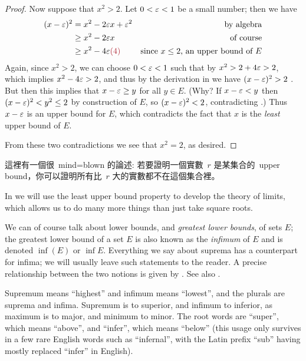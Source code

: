 \begin{proof}
Now suppose that \(x^2 > 2\).
Let \(0 < \varepsilon < 1\) be a small number;
then we have
\begin{align*}
    (x - \varE)^2 & = x^2 - 2\varE x + \varE^2 & \text{by algebra} \\
                  & \ge x^2 - 2\varE x & \text{of course} \\
                  & \ge x^2 - 4\varE \MAROON{(4)} & \text{since \(x \le 2\), an upper bound of \(E\)}
\end{align*}
Again, since \(x^2 > 2\), we can choose \(0 < \varepsilon < 1\) such that by  \(x^2 > 2 + 4\varepsilon > 2\), which implies \(x^2 - 4\varepsilon > 2\), and thus by the derivation in  we have \((x - \varepsilon)^2 > 2\) .
But then this implies that \(x - \varepsilon \ge y\) for all \(y \in E\). (Why? If \(x - \varepsilon < y\) then \((x - \varepsilon)^2 < y^2 \le 2\) by construction of \(E\), so \((x - \varepsilon)^2 < 2\), contradicting .)
Thus \(x - \varepsilon\) is an upper bound for \(E\), which contradicts the fact that \(x\) is the \emph{least} upper bound of \(E\).

From these two contradictions we see that \(x^2 = 2\), as desired.
\end{proof}

\begin{note}
這裡有一個很\ mind=blown 的論述: 若要證明一個實數\ \(r\) 是某集合的\ upper bound，你可以證明所有比\ \(r\) 大的實數都不在這個集合裡。
\end{note}

\begin{remark} \label{remark 5.5.14}
In  we will use the least upper bound property to develop the theory of limits, which allows us to do many more
things than just take square roots.
\end{remark}

\begin{remark} \label{remark 5.5.15}
We can of course talk about lower bounds, and \emph{greatest lower bounds}, of sets \(E\);
the greatest lower bound of a set \(E\) is also known as the \emph{infimum} of \(E\) and is denoted \(\inf(E)\) or \(\inf E\).
Everything we say about suprema has a counterpart for infima;
we will usually leave such statements to the reader.
A precise relationship between the two notions is given by .
See also .
\end{remark}

\begin{note}
Supremum means ``highest'' and infimum means ``lowest'', and the plurals are suprema and infima.
Supremum is to superior, and infimum to inferior, as maximum is to major, and minimum to minor.
The root words are ``super'', which means ``above'', and ``infer'', which means ``below''
(this usage only survives in a few rare English words such as ``infernal'', with the Latin prefix ``sub'' having mostly replaced ``infer'' in English).
\end{note}

